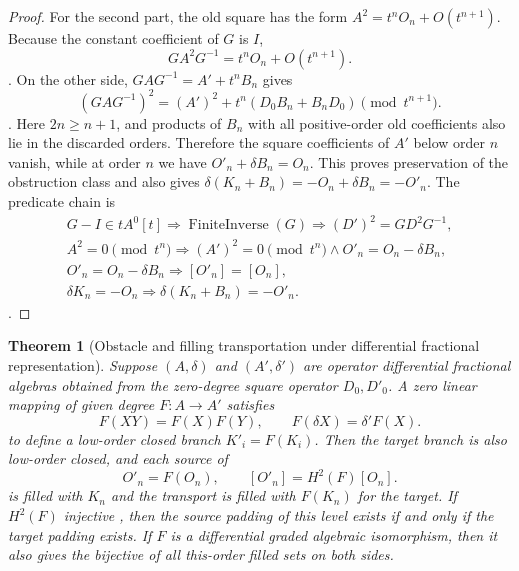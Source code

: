 \documentclass[12pt,a4paper,openany,notitlepage]{report}
\theoremstyle{plain}
\newtheorem{theorem}{Theorem}[chapter]
\theoremstyle{definition}
\theoremstyle{remark}
\def\mathcal#1{#1}\def\mathsf#1{#1}\def\mathbb#1{#1}%
\begin{document}
\begin{CJK*}
\begin{proof}
For the second part, the old square has the form
$A^2=t^nO_n+O(t^{n+1})$.
Because the constant coefficient of $G$ is $I$,
\[
 GA^2G^{-1}=t^nO_n+O(t^{n+1}).
\].
On the other side, $GAG^{-1}=A'+t^nB_n$ gives
\[
 (GAG^{-1})^2
 =(A')^2+t^n(D_0B_n+B_nD_0)
 \pmod{t^{n+1}}.
\].
Here $2n\ge n+1$, and products of $B_n$ with all positive-order old coefficients also lie in the discarded orders. Therefore the square coefficients of $A'$ below order $n$ vanish, while at order $n$ we have $O'_n+\delta B_n=O_n$. This proves preservation of the obstruction class and also gives
$\delta(K_n+B_n)=-O_n+\delta B_n=-O'_n$.
The predicate chain is
\[
 \begin{gathered}
 G-I\in t\mathcal A^0[t]
 \Rightarrow\operatorname{FiniteInverse}(G)
 \Rightarrow(D')^2=GD^2G^{-1},\\
 A^2=0\pmod{t^n}
 \Rightarrow(A')^2=0\pmod{t^n}
 \land O'_n=O_n-\delta B_n,\\
 O'_n=O_n-\delta B_n
 \Rightarrow[O'_n]=[O_n],\\
 \delta K_n=-O_n
 \Rightarrow\delta(K_n+B_n)=-O'_n.
 \end{gathered}
\].
\end{proof}

\begin{theorem}
[Obstacle and filling transportation under differential fractional representation]\label{exp:hom:dg-transport}
Suppose $(\mathcal A,\delta)$ and $(\mathcal A',\delta')$ are operator differential fractional algebras obtained from the zero-degree square operator $D_0,D'_0$. A zero linear mapping of given degree $F:\mathcal A\to\mathcal A'$ satisfies \[
 F(XY)=F(X)F(Y),\qquad
 F(\delta X)=\delta'F(X).
\] to define a low-order closed branch $K'_i=F(K_i)$. Then the target branch is also low-order closed, and each source of \[
 O'_n=F(O_n),\qquad
 [O'_n]=H^2(F)[O_n].
\] is filled with $K_n$ and the transport is filled with $F(K_n)$ for the target. If $H^2(F)$ injective , then the source padding of this level exists if and only if the target padding exists. If $F$ is a differential graded algebraic isomorphism, then it also gives the bijective of all this-order filled sets on both sides.


\end{theorem}
\end{CJK*}
\end{document}
